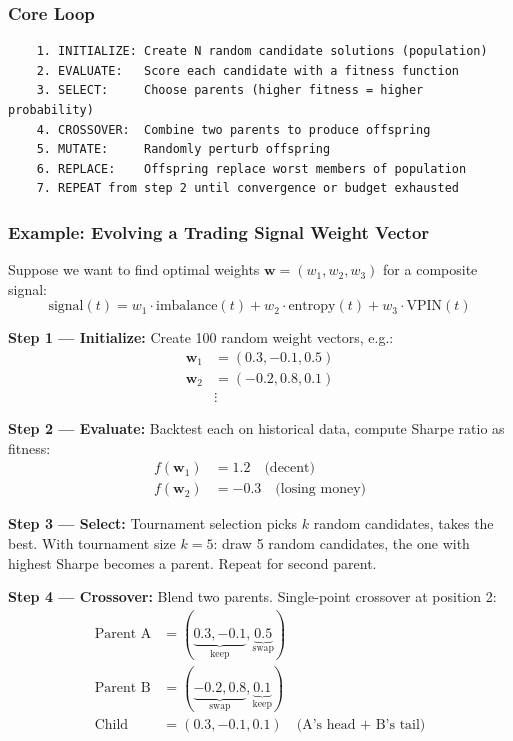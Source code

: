 \documentclass[11pt,a4paper]{article}
\begin{document}
\subsubsection{Core Loop}

\begin{verbatim}
    1. INITIALIZE: Create N random candidate solutions (population)
    2. EVALUATE:   Score each candidate with a fitness function
    3. SELECT:     Choose parents (higher fitness = higher probability)
    4. CROSSOVER:  Combine two parents to produce offspring
    5. MUTATE:     Randomly perturb offspring
    6. REPLACE:    Offspring replace worst members of population
    7. REPEAT from step 2 until convergence or budget exhausted
\end{verbatim}

\subsubsection{Example: Evolving a Trading Signal Weight Vector}

Suppose we want to find optimal weights $\mathbf{w} = (w_1, w_2, w_3)$ for a composite signal:
\begin{equation}
\text{signal}(t) = w_1 \cdot \text{imbalance}(t) + w_2 \cdot \text{entropy}(t) + w_3 \cdot \text{VPIN}(t)
\end{equation}

\textbf{Step 1 --- Initialize:} Create 100 random weight vectors, e.g.:
\begin{align*}
\mathbf{w}_1 &= (0.3, -0.1, 0.5) \\
\mathbf{w}_2 &= (-0.2, 0.8, 0.1) \\
&\vdots
\end{align*}

\textbf{Step 2 --- Evaluate:} Backtest each on historical data, compute Sharpe ratio as fitness:
\begin{align*}
f(\mathbf{w}_1) &= 1.2 \quad \text{(decent)} \\
f(\mathbf{w}_2) &= -0.3 \quad \text{(losing money)}
\end{align*}

\textbf{Step 3 --- Select:} Tournament selection picks $k$ random candidates, takes the best. With tournament size $k = 5$: draw 5 random candidates, the one with highest Sharpe becomes a parent. Repeat for second parent.

\textbf{Step 4 --- Crossover:} Blend two parents. Single-point crossover at position 2:
\begin{align*}
\text{Parent A} &= (\underbrace{0.3, -0.1}_{\text{keep}}, \underbrace{0.5}_{\text{swap}}) \\
\text{Parent B} &= (\underbrace{-0.2, 0.8}_{\text{swap}}, \underbrace{0.1}_{\text{keep}}) \\
\text{Child}   &= (0.3, -0.1, 0.1) \quad \text{(A's head + B's tail)}
\end{align*}
\end{document}
